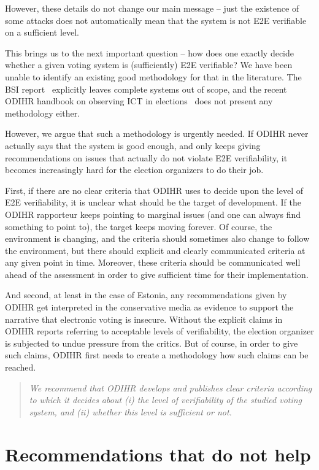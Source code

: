 \documentclass{llncs}
\begin{document}
However, these details do not change our main message -- just the existence of some attacks does not automatically mean that the system is not E2E verifiable on a sufficient level.
 
This brings us to the next important question -- how does one exactly decide whether a given voting system is (sufficiently) E2E verifiable? We have been unable to identify an existing  good methodology for that in the literature. The BSI report~\cite{BSIE2E} explicitly leaves complete systems out of scope, and the recent ODIHR handbook on observing ICT in elections~\cite{ODIHR_ICT-Handbook} does not present any methodology either. 

However, we argue that such a methodology is urgently needed. If ODIHR never actually says that the system is good enough, and only keeps giving recommendations on issues that actually do not violate E2E verifiability, it becomes increasingly hard for the election organizers to do their job. 

First, if there are no clear criteria that ODIHR uses to decide upon the level of E2E verifiability, it is unclear what should be the target of development. If the ODIHR rapporteur keeps pointing to marginal issues (and one can always find something to point to), the target keeps moving forever. Of course, the environment is changing, and the criteria should sometimes also change to follow the environment, but there should explicit and clearly communicated criteria at any given point in time. Moreover, these criteria should be communicated well ahead of the assessment in order to give sufficient time for their implementation.

And second, at least in the case of Estonia, any recommendations given by ODIHR get interpreted in the conservative media as evidence to support the narrative that electronic voting is insecure. Without the explicit claims in ODIHR reports referring to acceptable levels of verifiability, the election organizer is subjected to undue pressure from the critics. But of course, in order to give such claims, ODIHR first needs to create a methodology how such claims can be reached.

\begin{quote}
    \emph{We recommend that ODIHR develops and publishes clear criteria according to which it decides about (i) the level of verifiability of the studied voting system, and (ii) whether this level is sufficient or not.}
\end{quote}

\section{Recommendations that do not help}
\end{document}
